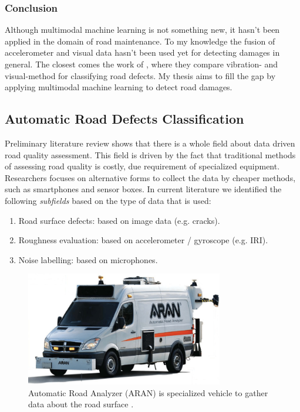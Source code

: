 \subsubsection{Conclusion}
Although multimodal machine learning is not something new, it hasn't been applied in the domain of road maintenance. To my knowledge the fusion of accelerometer and visual data hasn't been used yet for detecting damages in general. The closest comes the work of , where they compare vibration- and visual-method for classifying road defects. My thesis aims to fill the gap by applying multimodal machine learning to detect road damages. 


\subsection{Automatic Road Defects Classification}

Preliminary literature review shows that there is a whole field about data driven road quality assessment. This field is driven by the fact that traditional methods of assessing road quality is costly, due requirement of specialized equipment. Researchers focuses on alternative forms to collect the data by cheaper methods, such as smartphones and sensor boxes. In current literature we identified the following \textit{subfields} based on the type of data that is used:

\begin{enumerate}
\item Road surface defects: based on image data (e.g. cracks).
\item Roughness evaluation: based on accelerometer / gyroscope (e.g. IRI).
\item Noise labelling: based on microphones.
\end{enumerate}

\begin{figure}[h!]
\begin{center}
\includegraphics[height=5cm,keepaspectratio]{images/2_literature/aran.png}
\end{center}
\caption{Automatic Road Analyzer (ARAN) is specialized vehicle to gather data about the road surface \cite{Gupta2020}.}
\end{figure}

